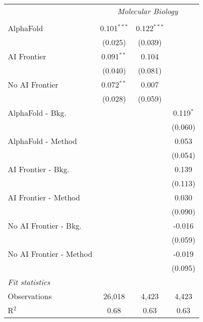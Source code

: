 \begin{tabular}{lccc}
 & \multicolumn{3}{c}{\textit{Molecular Biology}} \\ \\
   AlphaFold               & 0.101$^{***}$ & 0.122$^{***}$ &   \\   
                           & (0.025)       & (0.039)       &   \\   
   AI Frontier             & 0.091$^{**}$  & 0.104         &   \\   
                           & (0.040)       & (0.081)       &   \\   
   No AI Frontier          & 0.072$^{**}$  & 0.007         &   \\   
                           & (0.028)       & (0.059)       &   \\   
   AlphaFold - Bkg.        &               &               & 0.119$^{*}$\\   
                           &               &               & (0.060)\\   
   AlphaFold - Method      &               &               & 0.053\\   
                           &               &               & (0.054)\\   
   AI Frontier - Bkg.      &               &               & 0.139\\   
                           &               &               & (0.113)\\   
   AI Frontier - Method    &               &               & 0.030\\   
                           &               &               & (0.090)\\   
   No AI Frontier - Bkg.   &               &               & -0.016\\   
                           &               &               & (0.059)\\   
   No AI Frontier - Method &               &               & -0.019\\   
                           &               &               & (0.095)\\   
   \midrule
   \emph{Fit statistics}\\
   Observations            & 26,018        & 4,423         & 4,423\\  
   R$^2$                   & 0.68          & 0.63          & 0.63\\  
   

\end{tabular}
